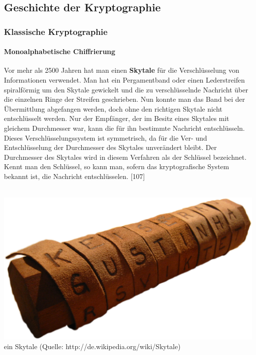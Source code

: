 \documentclass[12pt,a4paper]{report}
\begin{document}
\begin{onehalfspace}
\subsection{Geschichte der Kryptographie}

\subsubsection{Klassische Kryptographie}

\paragraph{Monoalphabetische Chiffrierung}

Vor mehr als 2500 Jahren hat man einen \textbf{Skytale} für die Verschlüsselung von Informationen verwendet. Man hat ein Pergamentband oder einen Lederstreifen spiralförmig um den Skytale gewickelt und die zu verschlüsselnde Nachricht über die einzelnen Ringe der Streifen geschrieben. Nun konnte man das Band bei der Übermittlung abgefangen werden, doch ohne den richtigen Skytale nicht entschlüsselt werden. Nur der Empfänger, der im Besitz eines Skytales mit gleichem Durchmesser war, kann die für ihn bestimmte Nachricht entschlüsseln. Dieses Verschlüsselungssystem ist symmetrisch, da für die Ver- und Entschlüsselung der Durchmesser des Skytales unverändert bleibt. Der Durchmesser des Skytales wird in diesem Verfahren als der Schlüssel bezeichnet. Kennt man den Schlüssel, so kann man, sofern das kryptografische System bekannt ist, die Nachricht entschlüsselen. [107]\\\\

\begin{center}
\includegraphics[scale=0.3]{img/krypto_skytale.png}\\
ein Skytale (Quelle: http://de.wikipedia.org/wiki/Skytale)
\end{center}


\end{onehalfspace}
\end{document}
